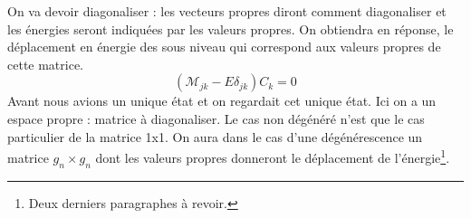 	On va devoir diagonaliser : les vecteurs propres diront comment diagonaliser et les énergies 
	seront indiquées par les valeurs propres. On obtiendra en réponse, le déplacement en 
	énergie des sous niveau qui correspond aux valeurs propres de cette 	matrice. 
	\begin{equation}
	(\mathcal{M}_{jk}-E\delta_{jk})C_k=0
	\end{equation}
	Avant nous avions un unique état et on regardait cet unique état. Ici 
	on a un espace propre : matrice à diagonaliser. Le cas non dégénéré n'est 
	que le cas particulier de la matrice 1x1. On aura dans le cas d'une 
	dégénérescence un matrice $g_n\times g_n$ dont les valeurs propres donneront le 
	déplacement de l'énergie\footnote{Deux derniers paragraphes à revoir.}.